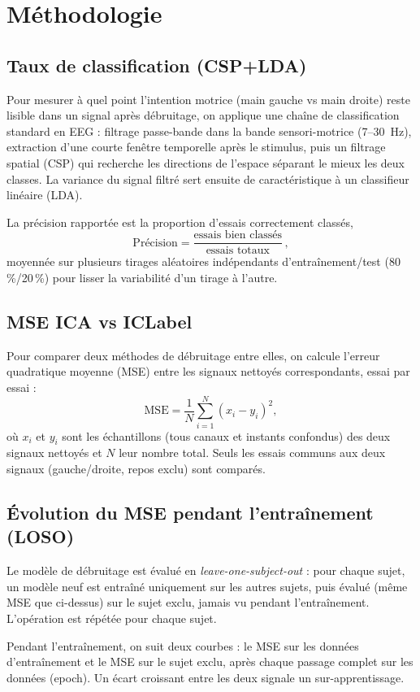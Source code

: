 \documentclass[11pt,a4paper]{article}
\begin{document}
\section{Méthodologie}

\subsection{Taux de classification (CSP+LDA)}
Pour mesurer à quel point l'intention motrice (main gauche vs main droite) reste
lisible dans un signal après débruitage, on applique une chaîne de classification
standard en EEG : filtrage passe-bande dans la bande sensori-motrice (7--30~Hz),
extraction d'une courte fenêtre temporelle après le stimulus, puis un filtrage
spatial (CSP) qui recherche les directions de l'espace séparant le mieux les
deux classes. La variance du signal filtré sert ensuite de caractéristique à un
classifieur linéaire (LDA).

La précision rapportée est la proportion d'essais correctement classés,
\[
  \text{Précision} = \frac{\text{essais bien classés}}{\text{essais totaux}}\,,
\]
moyennée sur plusieurs tirages aléatoires indépendants d'entraînement/test
(80\,\%/20\,\%) pour lisser la variabilité d'un tirage à l'autre.

\subsection{MSE ICA vs ICLabel}
Pour comparer deux méthodes de débruitage entre elles, on calcule l'erreur
quadratique moyenne (MSE) entre les signaux nettoyés correspondants, essai par
essai :
\[
  \text{MSE} = \frac{1}{N}\sum_{i=1}^{N} \left(x_i - y_i\right)^2 ,
\]
où $x_i$ et $y_i$ sont les échantillons (tous canaux et instants confondus) des
deux signaux nettoyés et $N$ leur nombre total. Seuls les essais communs aux
deux signaux (gauche/droite, repos exclu) sont comparés.

\subsection{Évolution du MSE pendant l'entraînement (LOSO)}
Le modèle de débruitage est évalué en \emph{leave-one-subject-out} : pour
chaque sujet, un modèle neuf est entraîné uniquement sur les autres sujets, puis
évalué (même MSE que ci-dessus) sur le sujet exclu, jamais vu pendant
l'entraînement. L'opération est répétée pour chaque sujet.

Pendant l'entraînement, on suit deux courbes : le MSE sur les données
d'entraînement et le MSE sur le sujet exclu, après chaque passage complet sur
les données (epoch). Un écart croissant entre les deux signale un
sur-apprentissage.
\end{document}
